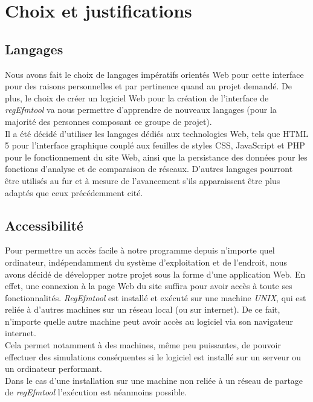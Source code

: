 \chapter{Choix et justifications}

\section{Langages}
Nous avons fait le choix de langages impératifs orientés Web pour cette interface pour des raisons personnelles et par pertinence quand au projet demandé. De plus, le choix de créer un logiciel Web pour la création de l'interface de \emph{regEfmtool} va nous permettre d'apprendre de nouveaux langages (pour la majorité des personnes composant ce groupe de projet). \\
Il a été décidé d'utiliser les langages dédiés aux technologies Web, tels que HTML 5 pour l'interface graphique couplé aux feuilles de styles CSS, JavaScript et PHP pour le fonctionnement du site Web, ainsi que la persistance des données pour les fonctions d'analyse et de comparaison de réseaux. D'autres langages pourront être utilisés au fur et à mesure de l'avancement s'ils apparaissent être plus adaptés que ceux précédemment cité.

\section{Accessibilité}
Pour permettre un accès facile à notre programme depuis n'importe quel ordinateur, indépendamment du système d'exploitation et de l'endroit, nous avons décidé de développer notre projet sous la forme d'une application Web. En effet, une connexion à la page Web du site suffira pour avoir accès à toute ses fonctionnalités. \emph{RegEfmtool} est installé et exécuté sur une machine \emph{UNIX}, qui est reliée à d'autres machines sur un réseau local (ou sur internet). De ce fait, n'importe quelle autre machine peut avoir accès au logiciel via son navigateur internet.\\
Cela permet notamment à des machines, même peu puissantes, de pouvoir effectuer des simulations conséquentes si le logiciel est installé sur un serveur ou un ordinateur performant.\\
Dans le cas d'une installation sur une machine non reliée à un réseau de partage de \emph{regEfmtool} l'exécution est néanmoins possible.

